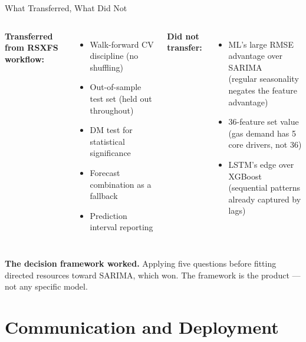\documentclass[aspectratio=169, 10pt]{beamer}
\begin{document}
\begin{frame}{What Transferred, What Did Not}
  \begin{columns}[T]
      \textbf{Transferred from RSXFS workflow:}
      \begin{itemize}\small
        \item Walk-forward CV discipline (no shuffling)
        \item Out-of-sample test set (held out throughout)
        \item DM test for statistical significance
        \item Forecast combination as a fallback
        \item Prediction interval reporting
      \end{itemize}
      \textbf{Did not transfer:}
      \begin{itemize}\small
        \item ML's large RMSE advantage over SARIMA\\
              {\footnotesize (regular seasonality negates the feature advantage)}
        \item 36-feature set value\\
              {\footnotesize (gas demand has 5 core drivers, not 36)}
        \item LSTM's edge over XGBoost\\
              {\footnotesize (sequential patterns already captured by lags)}
      \end{itemize}
  \end{columns}
  \vspace{0.2cm}
  \begin{keybox}
    {\small \textbf{The decision framework worked.} Applying five questions
    before fitting directed resources toward SARIMA, which won.
    The framework is the product --- not any specific model.}
  \end{keybox}
\end{frame}

\section{Communication and Deployment}
\end{document}
